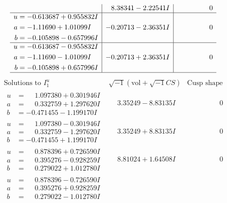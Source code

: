 \documentclass[1p]{elsarticle_modified}
\theoremstyle{definition}
\newcommand{\I}{\sqrt{-1}}
\begin{document}
$$\begin{array}{c|c|c}
 & \phantom{-}8.38341 - 2.22541 I & \phantom{-0.000000 } 0 \\ \hline\begin{aligned}
u &= -0.613687 + 0.955832 I \\
a &= -1.11690 + 1.01099 I \\
b &= -0.105898 - 0.657996 I\end{aligned}
 & -0.20713 - 2.36351 I & \phantom{-0.000000 } 0 \\ \hline\begin{aligned}
u &= -0.613687 - 0.955832 I \\
a &= -1.11690 - 1.01099 I \\
b &= -0.105898 + 0.657996 I\end{aligned}
 & -0.20713 + 2.36351 I & \phantom{-0.000000 } 0\\
 \hline 
 \end{array}$$\newpage$$\begin{array}{c|c|c}  
\text{Solutions to }I^u_{1}& \I (\text{vol} + \sqrt{-1}CS) & \text{Cusp shape}\\
 \hline 
\begin{aligned}
u &= \phantom{-}1.097380 + 0.301946 I \\
a &= \phantom{-}0.332759 + 1.297620 I \\
b &= -0.471455 - 1.199170 I\end{aligned}
 & \phantom{-}3.35249 - 8.83135 I & \phantom{-0.000000 } 0 \\ \hline\begin{aligned}
u &= \phantom{-}1.097380 - 0.301946 I \\
a &= \phantom{-}0.332759 - 1.297620 I \\
b &= -0.471455 + 1.199170 I\end{aligned}
 & \phantom{-}3.35249 + 8.83135 I & \phantom{-0.000000 } 0 \\ \hline\begin{aligned}
u &= \phantom{-}0.878396 + 0.726590 I \\
a &= \phantom{-}0.395276 - 0.928259 I \\
b &= \phantom{-}0.279022 + 1.012780 I\end{aligned}
 & \phantom{-}8.81024 + 1.64508 I & \phantom{-0.000000 } 0 \\ \hline\begin{aligned}
u &= \phantom{-}0.878396 - 0.726590 I \\
a &= \phantom{-}0.395276 + 0.928259 I \\
b &= \phantom{-}0.279022 - 1.012780 I\end{aligned}

\end{array}$$
\end{document}
